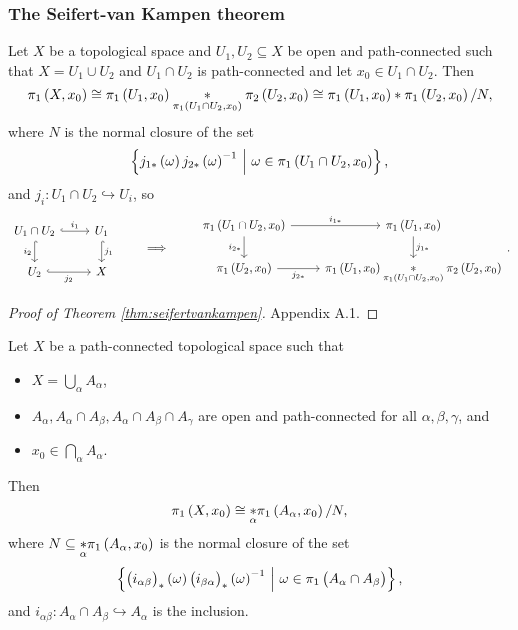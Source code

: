 \pagebreak

\subsubsection{The Seifert-van Kampen theorem}

\begin{theorem}
\label{thm:seifertvankampen}
Let $ X $ be a topological space and $ U_1, U_2 \subseteq X $ be open and path-connected such that $ X = U_1 \cup U_2 $ and $ U_1 \cap U_2 $ is path-connected and let $ x_0 \in U_1 \cap U_2 $. Then
$$ \pi_1\br{X, x_0} \cong \pi_1\br{U_1, x_0} \underset{\pi_1\br{U_1 \cap U_2, x_0}}{*} \pi_2\br{U_2, x_0} \cong \pi_1\br{U_1, x_0} * \pi_1\br{U_2, x_0} / N, $$
where $ N $ is the normal closure of the set
$$ \cbr{j_{1*}\br{\omega}j_{2*}\br{\omega}^{-1} \st \omega \in \pi_1\br{U_1 \cap U_2, x_0}}, $$
and $ j_i : U_1 \cap U_2 \hookrightarrow U_i $, so
$$
\begin{tikzcd}
U_1 \cap U_2 \arrow[hookrightarrow]{r}{i_1} \arrow[hookrightarrow, swap]{d}{i_2} & U_1 \arrow[hookrightarrow]{d}{j_1} \\
U_2 \arrow[hookrightarrow, swap]{r}{j_2} & X
\end{tikzcd}
\qquad \implies \qquad
\begin{tikzcd}
\pi_1\br{U_1 \cap U_2, x_0} \arrow{r}{i_{1*}} \arrow[swap]{d}{i_{2*}} & \pi_1\br{U_1, x_0} \arrow{d}{j_{1*}} \\
\pi_1\br{U_2, x_0} \arrow[swap]{r}{j_{2*}} & \pi_1\br{U_1, x_0} \underset{\pi_1\br{U_1 \cap U_2, x_0}}{*} \pi_2\br{U_2, x_0}
\end{tikzcd}.
$$
\end{theorem}

\begin{proof}[Proof of Theorem \ref{thm:seifertvankampen}]
Appendix A.1.
\end{proof}


\begin{theorem}
Let $ X $ be a path-connected topological space such that
\begin{itemize}
\item $ X = \bigcup_\alpha A_\alpha $,
\item $ A_\alpha, A_\alpha \cap A_\beta, A_\alpha \cap A_\beta \cap A_\gamma $ are open and path-connected for all $ \alpha, \beta, \gamma $, and
\item $ x_0 \in \bigcap_\alpha A_\alpha $.
\end{itemize}
Then
$$ \pi_1\br{X, x_0} \cong \underset{\alpha}{*} \pi_1\br{A_\alpha, x_0} / N, $$
where $ N \subseteq \underset{\alpha}{*} \pi_1\br{A_\alpha, x_0} $ is the normal closure of the set
$$ \cbr{\br{i_{\alpha\beta}}_*\br{\omega}\br{i_{\beta\alpha}}_*\br{\omega}^{-1} \st \omega \in \pi_1\br{A_\alpha \cap A_\beta}}, $$
and $ i_{\alpha\beta} : A_\alpha \cap A_\beta \hookrightarrow A_\alpha $ is the inclusion.
\end{theorem}

